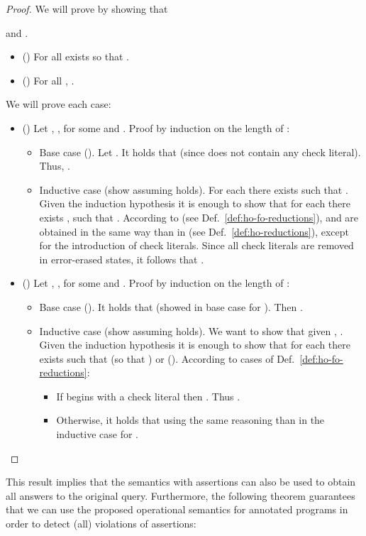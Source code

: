 \documentclass{llncs}
\begin{document}
\begin{proof}
We will prove  by showing that 
  
  and 
  .
\begin{itemize}
  \item () For all  exists
       so that .
  \item () For all , 
      .
  \end{itemize}
  We will prove each case:
  \begin{itemize}
\item () Let , , for some 
    and . Proof by induction on the length
     of :
    \begin{itemize}
    \item Base case (). Let . It holds that
       (since  does not contain any check literal).
Thus, .
    \item Inductive case (show  assuming  holds).
For each  there exists  such that .
Given the induction hypothesis
it is enough to show that for each 
      there exists , such that
      .
According to  (see
      Def.~\ref{def:ho-fo-reductions}),  and 
      are obtained in the same way than in  (see
      Def.~\ref{def:ho-reductions}), except for the introduction of
      check literals. Since all check literals are removed in
      error-erased states, it follows that .
\hfill 
    \end{itemize}
\item () Let , , for some  and
    . Proof by induction on the length
     of :
    \begin{itemize}
    \item Base case (). It holds that 
      (showed in base case for ). Then .
    \item Inductive case (show  assuming  holds).
We want to show that given ,
      .
Given the induction hypothesis
it is enough to show that for each 
      there exists  such that  (so that ) or  ().
According to cases of Def.~\ref{def:ho-fo-reductions}:
      \begin{itemize}
      \item If  begins with a check literal then
        . Thus
        .
      \item Otherwise, it holds that  using the same reasoning than in the inductive case
        for .
\hfill 
      \end{itemize}
    \end{itemize}
  \end{itemize}
\end{proof}

This result implies that the semantics with assertions can also be
used to obtain all answers to the original query. Furthermore, the
following theorem guarantees that we can use the proposed operational
semantics for annotated programs in order to detect (all) violations
of assertions:
\end{document}
